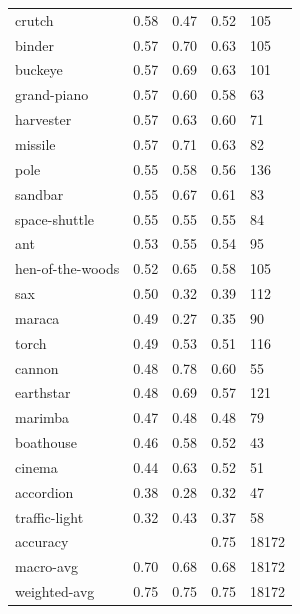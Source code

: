 \begin{center}
\begin{longtable}{lllll}
crutch & 0.58 & 0.47 & 0.52 & 105 \\
binder & 0.57 & 0.70 & 0.63 & 105 \\
buckeye & 0.57 & 0.69 & 0.63 & 101 \\
grand-piano & 0.57 & 0.60 & 0.58 & 63 \\
harvester & 0.57 & 0.63 & 0.60 & 71 \\
missile & 0.57 & 0.71 & 0.63 & 82 \\
pole & 0.55 & 0.58 & 0.56 & 136 \\
sandbar & 0.55 & 0.67 & 0.61 & 83 \\
space-shuttle & 0.55 & 0.55 & 0.55 & 84 \\
ant & 0.53 & 0.55 & 0.54 & 95 \\
hen-of-the-woods & 0.52 & 0.65 & 0.58 & 105 \\
sax & 0.50 & 0.32 & 0.39 & 112 \\
maraca & 0.49 & 0.27 & 0.35 & 90 \\
torch & 0.49 & 0.53 & 0.51 & 116 \\
cannon & 0.48 & 0.78 & 0.60 & 55 \\
earthstar & 0.48 & 0.69 & 0.57 & 121 \\
marimba & 0.47 & 0.48 & 0.48 & 79 \\
boathouse & 0.46 & 0.58 & 0.52 & 43 \\
cinema & 0.44 & 0.63 & 0.52 & 51 \\
accordion & 0.38 & 0.28 & 0.32 & 47 \\
traffic-light & 0.32 & 0.43 & 0.37 & 58 \\
\midrule
accuracy &  &  & 0.75 & 18172 \\
macro-avg & 0.70 & 0.68 & 0.68 & 18172 \\
weighted-avg & 0.75 & 0.75 & 0.75 & 18172 \\
\bottomrule
\end{longtable}
\end{center}
